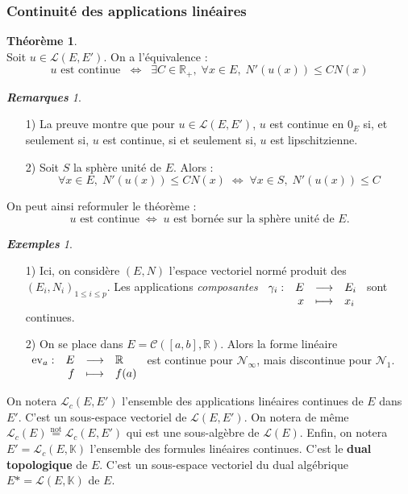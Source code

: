\documentclass[12pt]{book}
\let\ensembleNombre\mathbb
\newcommand*\R{\ensuremath{\ensembleNombre{R}}}
\newcommand*\K{\ensuremath{\ensembleNombre{K}}}
\newcommand{\app}[5]{\ensuremath{
\begin{array}[t]{lrcl}
#1 : & #2 & \longrightarrow & #3 \\
    & #4 & \longmapsto & #5 \end{array}
}}
\theoremstyle{definition}
\newtheorem{thme}{Théorème}[chapter]
\theoremstyle{remark}
\newtheorem*{rems}{\textbf{Remarques}}
\newtheorem*{exs}{\textbf{Exemples}}
\newenvironment{fthme}
  {\begin{mdframed}[roundcorner=10pt, linewidth=2pt]\begin{thme}}
  {\end{thme}\end{mdframed}}
\begin{document}
			\subsubsection{Continuité des applications linéaires}
	\begin{fthme}\mbox{~}\\
	Soit $u \in \mathcal L(E, E')$. On a l'équivalence :
	\[ u \text{ est continue } \;\Longleftrightarrow\;\; \exists C \in \R_+,\; \forall x \in E,\; N'(u(x)) \leq CN(x) \]
	\end{fthme}
	
	\begin{rems}\mbox{~}\\
	\begin{itemize}
	\item[1)] La preuve montre que pour $u \in \mathcal L(E,E')$, $u$ est continue en $0_E$ si, et seulement si, $u$ est continue, si et seulement si, $u$ est lipschitzienne.
	\item[2)] Soit $S$ la sphère unité de $E$. Alors :
	\[ \forall x \in E,\; N'(u(x)) \leq CN(x) \;\Longleftrightarrow\; \forall x \in S, \; N'(u(x)) \leq C\]
	\end{itemize}
	\end{rems}
	
	On peut ainsi reformuler le théorème :
	\[ \boxed{ u \text{ est continue} \;\Longleftrightarrow\; u \text{ est bornée sur la sphère unité de } E. } \]
	
	\begin{exs}\mbox{~}\\
	\begin{itemize}
	\item[1)] Ici, on considère $(E,N)$ l'espace vectoriel normé produit des $(E_i, N_i)_{1 \leq i \leq p}$. Les applications \textit{composantes} $\app{\gamma_i}{E}{E_i}{x}{x_i}$ sont continues.
	\item[2)] On se place dans $E = \mathcal C([a,b], \R)$. Alors la forme linéaire $\app{\mathrm{ev}_a}{E}{\R}{f}{f(a)}$ est continue pour $\mathcal N_{\infty}$, mais discontinue pour $\mathcal N_1$.
	\end{itemize}
	\end{exs}
	
	On notera $\mathcal L_c(E,E')$ l'ensemble des applications linéaires continues de $E$ dans $E'$. C'est un sous-espace vectoriel de $\mathcal L(E,E')$. On notera de même $\mathcal L_c(E) \overset{\mathrm{not}}{=} \mathcal L_c(E,E')$ qui est une sous-algèbre de $\mathcal L(E)$. Enfin, on notera $E' = \mathcal L_c(E, \K)$ l'ensemble des formules linéaires continues. C'est le \textbf{dual topologique} de $E$. C'est un sous-espace vectoriel du dual algébrique $E* = \mathcal L(E,\K)$ de $E$.
	
\end{document}
